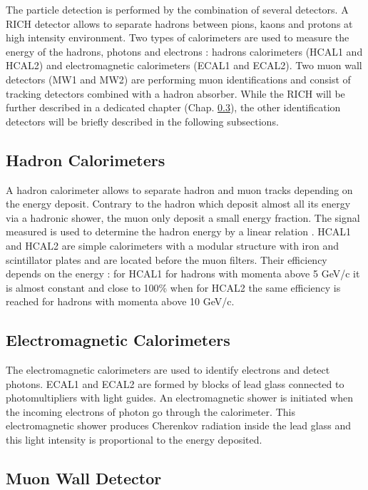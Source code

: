 The particle detection is performed by the combination of several detectors. A RICH detector allows to separate hadrons between pions, kaons and protons
at high intensity environment. Two types of calorimeters are used to measure the energy of the hadrons, photons and electrons : hadrons calorimeters
(HCAL1 and HCAL2) and electromagnetic calorimeters (ECAL1 and ECAL2). Two muon wall detectors (MW1 and MW2) are performing muon identifications and
consist of tracking detectors combined with a hadron absorber. While the RICH will be further described in a dedicated chapter (Chap. \ref{}), the other
identification detectors will be briefly described in the following subsections.

\subsection{Hadron Calorimeters}

A hadron calorimeter allows to separate hadron and muon tracks depending on the energy deposit. Contrary to the hadron which deposit almost all its energy
via a hadronic shower, the muon only deposit a small energy fraction. The signal measured is used to determine the hadron energy by a linear relation \cite{}.
HCAL1 and HCAL2 are simple calorimeters with a modular structure with iron and scintillator plates and are located before the muon filters. Their efficiency
depends on the energy : for HCAL1 for hadrons with momenta above 5 GeV/c it is almost constant and close to 100\% when for HCAL2 the same efficiency is reached
for hadrons with momenta above 10 GeV/c.

\subsection{Electromagnetic Calorimeters}

The electromagnetic calorimeters are used to identify electrons and detect photons. ECAL1 and ECAL2 are formed by blocks of lead glass connected to photomultipliers
with light guides. An electromagnetic shower is initiated when the incoming electrons of photon go through the calorimeter. This electromagnetic shower produces
Cherenkov radiation inside the lead glass and this light intensity is proportional to the energy deposited.

\subsection{Muon Wall Detector}

